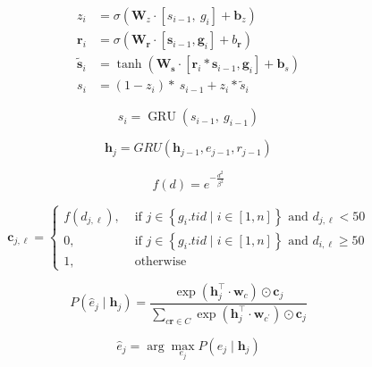 \begin{equation}\begin{aligned} {z}_{i} &=\sigma\left(\mathbf{W}_{{z}} \cdot\left[{s}_{i-1}, {~g}_{i}\right]+\mathbf{b}_{{z}}\right) \\ \mathbf{r}_{i} &=\sigma\left(\mathbf{W}_{\mathbf{r}} \cdot\left[\mathbf{s}_{i-1}, \mathbf{g}_{i}\right]+{b}_{\mathbf{r}}\right) \\ \tilde{\mathbf{s}}_{i} &=\tanh \left(\mathbf{W}_{\mathbf{s}} \cdot\left[\mathbf{r}_{i} * \mathbf{s}_{i-1}, \mathbf{g}_{i}\right]+\mathbf{b}_{{s}}\right) \\ s_{i} &=\left(1-{z}_{i}\right) * {~s}_{i-1}+{z}_{i} * \tilde{{s}}_{i} \end{aligned}\end{equation}

\begin{equation} {s}_{i}=\operatorname{GRU}\left({s}_{i-1}, {~g}_{i-1}\right) \end{equation}

\begin{equation} \mathbf{h}_{j}=G R U\left(\mathbf{h}_{j-1}, e_{j-1}, r_{j-1}\right) \end{equation}

\begin{equation} f(d)=e^{-\frac{d^{2}}{\beta^{2}}} \end{equation}

\begin{equation}
\mathbf{c}_{j, \ell}= \begin{cases}f\left(d_{j, \ell}\right), & \text { if } j \in\left\{g_{i} . t i d \mid i \in[1, n]\right\} \text { and } d_{j, \ell}<50 \\ 0, & \text { if } j \in\left\{g_{i} . t i d \mid i \in[1, n]\right\} \text { and } d_{i, \ell} \geq 50 \\ 1, & \text { otherwise }\end{cases}
\end{equation}

\begin{equation}
P\left(\hat{e}_{j} \mid \mathbf{h}_{j}\right)=\frac{\exp \left(\mathbf{h}_{j}^{\top} \cdot \mathbf{w}_{c}\right) \odot \mathbf{c}_{j}}{\sum_{c \boldsymbol{r} \in C} \exp \left(\mathbf{h}_{j}^{\top} \cdot \mathbf{w}_{c^{\prime}}\right) \odot \mathbf{c}_{j}}
\end{equation}

\begin{equation}\hat{e}_j = \arg \max_{e_j} P\left({e}_{j} \mid \mathbf{h}_{j}\right)\end{equation}

